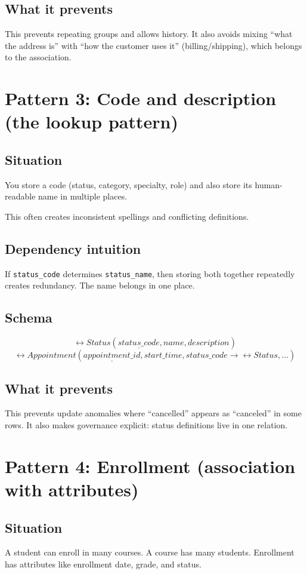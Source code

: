 \subsection{What it prevents}
This prevents repeating groups and allows history.
It also avoids mixing “what the address is” with “how the customer uses it” (billing/shipping), which belongs to the association.

\section{Pattern 3: Code and description (the lookup pattern)}
\subsection{Situation}
You store a code (status, category, specialty, role) and also store its human-readable name in multiple places.

This often creates inconsistent spellings and conflicting definitions.

\subsection{Dependency intuition}
If \texttt{status\_code} determines \texttt{status\_name}, then storing both together repeatedly creates redundancy.
The name belongs in one place.

\subsection{Schema}
\[
\rel{Status}(\underline{status\_code}, name, description)
\]
\[
\rel{Appointment}(\underline{appointment\_id}, start\_time, status\_code \rightarrow \rel{Status}, \dots)
\]

\subsection{What it prevents}
This prevents update anomalies where “cancelled” appears as “canceled” in some rows.
It also makes governance explicit: status definitions live in one relation.

\section{Pattern 4: Enrollment (association with attributes)}
\subsection{Situation}
A student can enroll in many courses.
A course has many students.
Enrollment has attributes like enrollment date, grade, and status.

